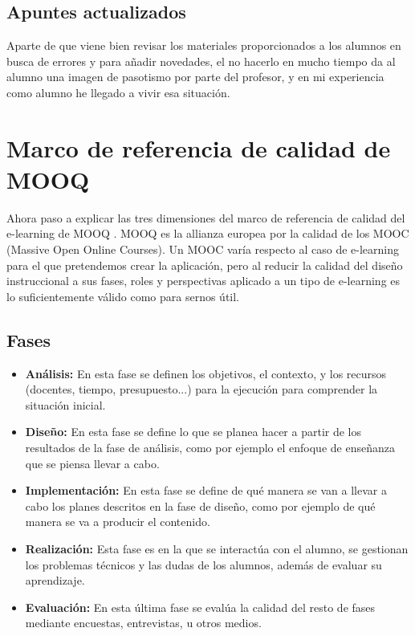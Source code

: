 \subsection{Apuntes actualizados}
Aparte de que viene bien revisar los materiales proporcionados a los alumnos en busca de errores y para añadir novedades, el no hacerlo en mucho tiempo da al alumno una imagen de pasotismo por parte del profesor, y en mi experiencia como alumno he llegado a vivir esa situación.


\section{Marco de referencia de calidad de MOOQ}
Ahora paso a explicar las tres dimensiones del marco de referencia de calidad del e-learning de MOOQ \cite{stracke2018quality}. MOOQ es la allianza europea por la calidad de los MOOC (Massive Open Online Courses). Un MOOC varía respecto al caso de e-learning para el que pretendemos crear la aplicación, pero al reducir la calidad del diseño instruccional a sus fases, roles y perspectivas aplicado a un tipo de e-learning es lo suficientemente válido como para sernos útil.
\subsection{Fases}
\begin{itemize}
	\item \textbf{Análisis:}
	En esta fase se definen los objetivos, el contexto, y los recursos (docentes, tiempo, presupuesto...) para la ejecución para comprender la situación inicial.
	\item \textbf{Diseño:}
	En esta fase se define lo que se planea hacer a partir de los resultados de la fase de análisis, como por ejemplo el enfoque de enseñanza que se piensa llevar a cabo.
	\item \textbf{Implementación:}
	En esta fase se define de qué manera se van a llevar a cabo los planes descritos en la fase de diseño, como por ejemplo de qué manera se va a producir el contenido.
	\item \textbf{Realización:}
	Esta fase es en la que se interactúa con el alumno, se gestionan los problemas técnicos y las dudas de los alumnos, además de evaluar su aprendizaje.
	\item \textbf{Evaluación:}
	En esta última fase se evalúa la calidad del resto de fases mediante encuestas, entrevistas, u otros medios.
\end{itemize}

